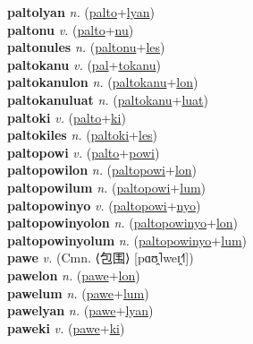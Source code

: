 \textbf{paltolyan} \textit{n.} (\hyperref[palto]{palto}+\hyperref[lyan]{lyan})
 \label{paltolyan} \\
\textbf{paltonu} \textit{v.} (\hyperref[palto]{palto}+\hyperref[nu]{nu})
 \label{paltonu} \\
\textbf{paltonules} \textit{n.} (\hyperref[paltonu]{paltonu}+\hyperref[les]{les})
 \label{paltonules} \\
\textbf{paltokanu} \textit{v.} (\hyperref[pal]{pal}+\hyperref[tokanu]{tokanu})
 \label{paltokanu} \\
\textbf{paltokanulon} \textit{n.} (\hyperref[paltokanu]{paltokanu}+\hyperref[lon]{lon})
 \label{paltokanulon} \\
\textbf{paltokanuluat} \textit{n.} (\hyperref[paltokanu]{paltokanu}+\hyperref[luat]{luat})
 \label{paltokanuluat} \\
\textbf{paltoki} \textit{v.} (\hyperref[palto]{palto}+\hyperref[ki]{ki})
 \label{paltoki} \\
\textbf{paltokiles} \textit{n.} (\hyperref[paltoki]{paltoki}+\hyperref[les]{les})
 \label{paltokiles} \\
\textbf{paltopowi} \textit{v.} (\hyperref[palto]{palto}+\hyperref[powi]{powi})
 \label{paltopowi} \\
\textbf{paltopowilon} \textit{n.} (\hyperref[paltopowi]{paltopowi}+\hyperref[lon]{lon})
 \label{paltopowilon} \\
\textbf{paltopowilum} \textit{n.} (\hyperref[paltopowi]{paltopowi}+\hyperref[lum]{lum})
 \label{paltopowilum} \\
\textbf{paltopowinyo} \textit{v.} (\hyperref[paltopowi]{paltopowi}+\hyperref[nyo]{nyo})
 \label{paltopowinyo} \\
\textbf{paltopowinyolon} \textit{n.} (\hyperref[paltopowinyo]{paltopowinyo}+\hyperref[lon]{lon})
 \label{paltopowinyolon} \\
\textbf{paltopowinyolum} \textit{n.} (\hyperref[paltopowinyo]{paltopowinyo}+\hyperref[lum]{lum})
 \label{paltopowinyolum} \\
\textbf{pawe} \textit{v.} (Cmn. ⟨包围⟩ [pɑʊ̯˥weɪ̯˧˥])
 \label{pawe} \\
\textbf{pawelon} \textit{n.} (\hyperref[pawe]{pawe}+\hyperref[lon]{lon})
 \label{pawelon} \\
\textbf{pawelum} \textit{n.} (\hyperref[pawe]{pawe}+\hyperref[lum]{lum})
 \label{pawelum} \\
\textbf{pawelyan} \textit{n.} (\hyperref[pawe]{pawe}+\hyperref[lyan]{lyan})
 \label{pawelyan} \\
\textbf{paweki} \textit{v.} (\hyperref[pawe]{pawe}+\hyperref[ki]{ki})
